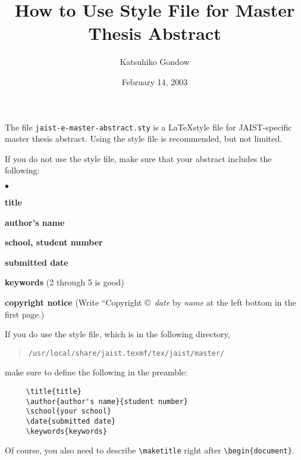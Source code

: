 \documentclass[12pt]{article}
\title{How to Use Style File for Master Thesis Abstract} %
\author{Katsuhiko Gondow}{110123}       %
\date{February 14, 2003}                %
\begin{document}
\maketitle

The file \verb+jaist-e-master-abstract.sty+ is a \LaTeX style file
for JAIST-specific master thesis abstract.
Using the style file is recommended, but not limited.

If you do not use the style file, make sure that your abstract
includes the following:
\begin{list}{$\bullet$}{\itemsep0pt}
\item {\bf title}
\item {\bf author's name}
\item {\bf school, student number}
\item {\bf submitted date}
\item {\bf keywords} (2 through 5 is good)
\item {\bf copyright notice} 
	(Write ``Copyright \copyright\ \textit{date} by \textit{name}
    	 at the left bottom in the first page.)
\end{list}

If you do use the style file, which is in the following directory,
\begin{quote}
\texttt{/usr/local/share/jaist.texmf/tex/jaist/master/}
\end{quote}
make sure to define the following in the preamble:
\begin{verbatim}
     \title{title}
     \author{author's name}{student number}
     \school{your school}
     \date{submitted date}
     \keywords{keywords}
\end{verbatim}

Of course, you also need to describe \verb+\maketitle+ right after
\verb+\begin{document}+.
\end{document}
